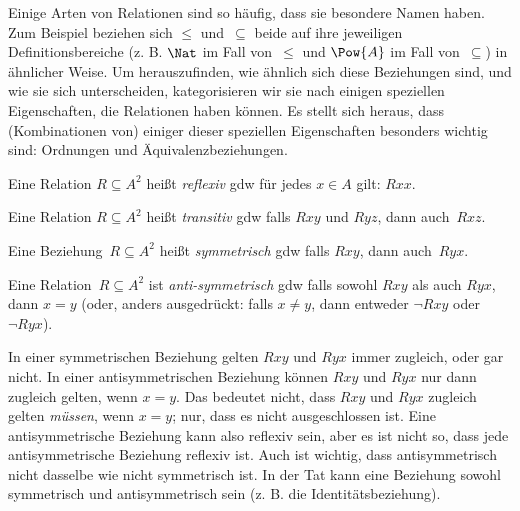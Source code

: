 \documentclass[../../../include/open-logic-section]{subfiles}
\begin{document}

\begin{intro}
Einige Arten von Relationen sind so häufig, dass sie besondere Namen haben.
Zum Beispiel beziehen sich $\le$ und~$\subseteq$ beide auf
ihre jeweiligen Definitionsbereiche (z. B. $\Nat$ im Fall von~$\le$ und
$\Pow{A}$ im Fall von~$\subseteq$) in ähnlicher Weise.  Um herauszufinden,
wie ähnlich sich diese Beziehungen sind, und wie sie sich unterscheiden,
kategorisieren wir sie nach einigen speziellen Eigenschaften, die Relationen
haben können.  Es stellt sich heraus, dass (Kombinationen von) einiger dieser speziellen
Eigenschaften besonders wichtig sind: Ordnungen und Äquivalenzbeziehungen.
\end{intro}

\begin{defn}[Reflexivität]
Eine Relation $R \subseteq A^2$ heißt \emph{reflexiv} gdw für jedes $x \in
A$ gilt: $Rxx$.
\end{defn}

\begin{defn}[Transitivität]
Eine Relation $R \subseteq A^2$ heißt \emph{transitiv} gdw falls $Rxy$
und $Ryz$, dann auch~$Rxz$.
\end{defn}

\begin{defn}[Symmetrie]
Eine Beziehung~$R \subseteq A^2$ heißt \emph{symmetrisch} gdw falls
$Rxy$, dann auch~$Ryx$.
\end{defn}

\begin{defn}[Antisymmetrie]
Eine Relation~$R \subseteq A^2$ ist \emph{anti-sym\-metrisch} gdw falls sowohl
$Rxy$ als auch $Ryx$, dann $x=y$ (oder, anders ausgedrückt: falls $x\neq y$, dann
entweder $\lnot Rxy$ oder $\lnot Ryx$).
\end{defn}

\begin{explain}
In einer symmetrischen Beziehung gelten $Rxy$ und $Ryx$ immer zugleich, oder
gar nicht.  In einer antisymmetrischen Beziehung können $Rxy$
und $Ryx$ nur dann zugleich gelten, wenn $x = y$. Das bedeutet nicht,
dass $Rxy$ und $Ryx$ zugleich gelten \emph{müssen}, wenn $x = y$; nur, dass es
nicht ausgeschlossen ist.  Eine antisymmetrische Beziehung kann also reflexiv sein, aber
es ist nicht so, dass jede antisymmetrische Beziehung reflexiv ist.
Auch ist wichtig, dass \glqq antisymmetrisch\grqq{} nicht dasselbe wie
\glqq nicht symmetrisch\grqq{} ist.  In der Tat kann eine Beziehung sowohl
symmetrisch und antisymmetrisch sein (z. B. die Identitätsbeziehung).
\end{explain}
\end{document}
